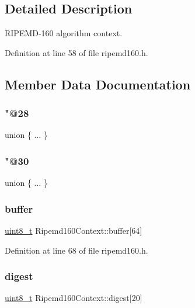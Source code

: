 \subsection{Detailed Description}
R\+I\+P\+E\+M\+D-\/160 algorithm context. 

Definition at line 58 of file ripemd160.\+h.



\subsection{Member Data Documentation}
\mbox{\label{structRipemd160Context_a3dfdfff50bcdcfafcf37736b852ba4ae}} 
\subsubsection{\texorpdfstring{"@28}{@28}}
{\footnotesize\ttfamily union \{ ... \} }

\mbox{\label{structRipemd160Context_a337b6091e0ebd558218cdf1a4ac82ae2}} 
\subsubsection{\texorpdfstring{"@30}{@30}}
{\footnotesize\ttfamily union \{ ... \} }

\mbox{\label{structRipemd160Context_a5edd8e76546b440a0f2b9918288c8d75}} 
\subsubsection{\texorpdfstring{buffer}{buffer}}
{\footnotesize\ttfamily \hyperlink{stdint_8h_aba7bc1797add20fe3efdf37ced1182c5}{uint8\+\_\+t} Ripemd160\+Context\+::buffer\mbox{[}64\mbox{]}}



Definition at line 68 of file ripemd160.\+h.

\mbox{\label{structRipemd160Context_adc5a38ab33e19b025767fce363b2b90a}} 
\subsubsection{\texorpdfstring{digest}{digest}}
{\footnotesize\ttfamily \hyperlink{stdint_8h_aba7bc1797add20fe3efdf37ced1182c5}{uint8\+\_\+t} Ripemd160\+Context\+::digest\mbox{[}20\mbox{]}}



